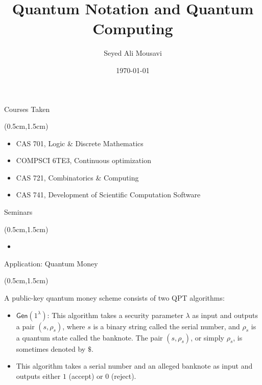 \documentclass{beamer}
\title{Quantum Notation and Quantum Computing}
\author{Seyed Ali Mousavi}
\date{\today}
\theoremstyle{definition}
\newcommand{\gen}{\mathsf{Gen}}
\begin{document}
\begin{frame}
    \titlepage
\end{frame}





\begin{frame}{Courses Taken}
    
    \begin{textblock*}{12cm}(0.5cm,1.5cm)
       \begin{itemize}
        \item CAS 701,  Logic \& Discrete Mathematics
        \item COMPSCI 6TE3, Continuous optimization
        \item CAS 721, Combinatorics \& Computing
        \item CAS 741, Development of Scientific Computation Software
       \end{itemize}
    \end{textblock*}
    


\end{frame}




\begin{frame}{Seminars}
    
    \begin{textblock*}{12cm}(0.5cm,1.5cm)
       \begin{itemize}
        \item 
       \end{itemize}
    \end{textblock*}
    

\end{frame}






\begin{frame}{Application: Quantum Money}
    
    \begin{textblock*}{12cm}(0.5cm,1.5cm)
            
        A public-key quantum money scheme consists of two QPT algorithms: 
        \begin{itemize}
        \item $\gen(1^\lambda)$: This algorithm takes a security parameter $\lambda$ as input and outputs a pair $(s, \rho_s)$, where $s$ is a binary string called the serial number, and $\rho_s$ is a quantum state called the banknote. The pair $(s, \rho_s)$, or simply $\rho_s$, is sometimes denoted by $\$$.
        \item    This algorithm takes a serial number and an alleged banknote as input and outputs either $1$ (accept) or $0$ (reject).
        \end{itemize}

    \end{textblock*}


\end{frame}
\end{document}
